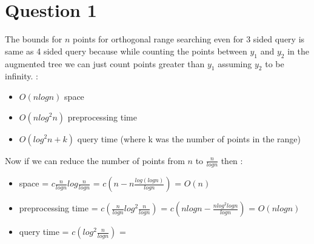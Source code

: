 \documentclass[11pt]{article}
\begin{document}
\section*{Question 1}
The bounds for $n$ points for orthogonal range searching even for 3 sided query is same as 4 sided query because while counting the points between $y_1$ and $y_2$ in the augmented tree we can just count points greater than $y_1$ assuming $y_2$ to be infinity.  :
\begin{itemize}
\item $O(nlog n)$ space 
\item $O(nlog^2 n)$ preprocessing time 
\item $O(log^2 n + k)$ query time (where k was the number of points in the range)
\end{itemize}
Now if we can reduce the number of points from $n$ to $\frac{n}{log n}$ then :
\begin{itemize}
\item space = $c\frac{n}{log n}log \frac{n}{log n}$ = $c(n - n\frac{log (log n)}{log n})$ = $O(n)$
\item preprocessing time = $c(\frac{n}{log n}log^2 \frac{n}{log n})$ = $c(nlog n - \frac{nlog^2 log n}{log n})$ = $O(nlog n)$
\item query time = $c(log^2 \frac{n}{log n})$ = 
\end{itemize}

\pagebreak
\end{document}
